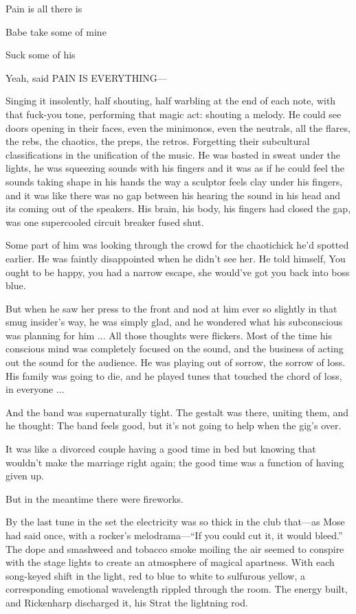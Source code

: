 Pain is all there is

Babe take some of mine

Suck some of his

Yeah, said PAIN IS EVERYTHING—

Singing it insolently, half shouting, half warbling at the end of each note, with that fuck-you tone, performing that magic act: shouting a melody. He could see doors opening in their faces, even the minimonos, even the neutrals, all the flares, the rebs, the chaotics, the preps, the retros. Forgetting their subcultural classifications in the unification of the music. He was basted in sweat under the lights, he was squeezing sounds with his fingers and it was as if he could feel the sounds taking shape in his hands the way a sculptor feels clay under his fingers, and it was like there was no gap between his hearing the sound in his head and its coming out of the speakers. His brain, his body, his fingers had closed the gap, was one supercooled circuit breaker fused shut.

Some part of him was looking through the crowd for the chaotichick he'd spotted earlier. He was faintly disappointed when he didn't see her. He told himself, You ought to be happy, you had a narrow escape, she would've got you back into boss blue.

But when he saw her press to the front and nod at him ever so slightly in that smug insider's way, he was simply glad, and he wondered what his subconscious was planning for him ... All those thoughts were flickers. Most of the time his conscious mind was completely focused on the sound, and the business of acting out the sound for the audience. He was playing out of sorrow, the sorrow of loss. His family was going to die, and he played tunes that touched the chord of loss, in everyone ...

And the band was supernaturally tight. The gestalt was there, uniting them, and he thought: The band feels good, but it's not going to help when the gig's over.

It was like a divorced couple having a good time in bed but knowing that wouldn't make the marriage right again; the good time was a function of having given up.

But in the meantime there were fireworks.

By the last tune in the set the electricity was so thick in the club that—as Mose had said once, with a rocker's melodrama—``If you could cut it, it would bleed.'' The dope and smashweed and tobacco smoke moiling the air seemed to conspire with the stage lights to create an atmosphere of magical apartness. With each song-keyed shift in the light, red to blue to white to sulfurous yellow, a corresponding emotional wavelength rippled through the room. The energy built, and Rickenharp discharged it, his Strat the lightning rod.

